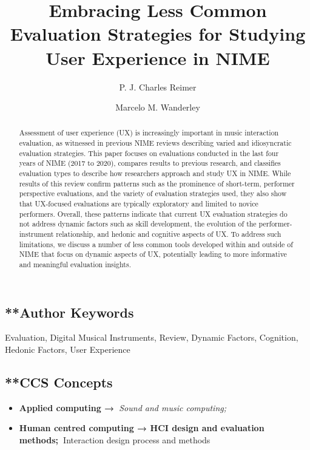 \documentclass[sigconf]{nimeart}
\begin{document}
\title[Embracing Less Common Evaluation Strategies for Studying User…]{Embracing Less Common Evaluation Strategies for Studying User Experience in NIME}
\author{P. J. Charles Reimer}
\author{Marcelo M. Wanderley}
\renewcommand{\shortauthors}{Reimer and Wanderley}
\begin{abstract}
Assessment of user experience (UX) is increasingly important in music interaction evaluation, as witnessed in previous NIME reviews describing varied and idiosyncratic evaluation strategies. This paper focuses on evaluations conducted in the last four years of NIME (2017 to 2020), compares results to previous research, and classifies evaluation types to describe how researchers approach and study UX in NIME. While results of this review confirm patterns such as the prominence of short-term, performer perspective evaluations, and the variety of evaluation strategies used, they also show that UX-focused evaluations are typically exploratory and limited to novice performers. Overall, these patterns indicate that current UX evaluation strategies do not address dynamic factors such as skill development, the evolution of the performer-instrument relationship, and hedonic and cognitive aspects of UX. To address such limitations, we discuss a number of less common tools developed within and outside of NIME that focus on dynamic aspects of UX, potentially leading to more informative and meaningful evaluation insights.
\end{abstract}


\maketitle
\subsection{**Author Keywords}\label{author-keywords}

Evaluation, Digital Musical Instruments, Review, Dynamic Factors, Cognition, Hedonic Factors, User Experience

\subsection{**CCS Concepts}\label{ccs-concepts}

\begin{itemize}
\item
  \textbf{Applied computing →~}\emph{Sound and music computing;}
\item
  \textbf{Human centred computing → HCI design and evaluation methods;~}Interaction design process and methods
\end{itemize}
\end{document}
